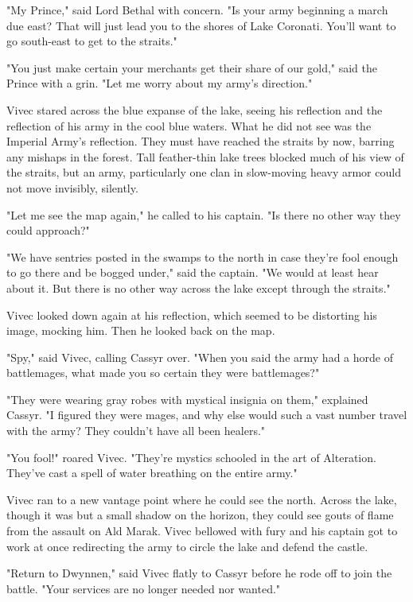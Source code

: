 "My Prince," said Lord Bethal with concern. "Is your army beginning a march due east? That will just lead you to the shores of Lake Coronati. You'll want to go south-east to get to the straits."

"You just make certain your merchants get their share of our gold," said the Prince with a grin. "Let me worry about my army's direction."

Vivec stared across the blue expanse of the lake, seeing his reflection and the reflection of his army in the cool blue waters. What he did not see was the Imperial Army's reflection. They must have reached the straits by now, barring any mishaps in the forest. Tall feather-thin lake trees blocked much of his view of the straits, but an army, particularly one clan in slow-moving heavy armor could not move invisibly, silently.

"Let me see the map again," he called to his captain. "Is there no other way they could approach?"

"We have sentries posted in the swamps to the north in case they're fool enough to go there and be bogged under," said the captain. "We would at least hear about it. But there is no other way across the lake except through the straits."

Vivec looked down again at his reflection, which seemed to be distorting his image, mocking him. Then he looked back on the map.

"Spy," said Vivec, calling Cassyr over. "When you said the army had a horde of battlemages, what made you so certain they were battlemages?"

"They were wearing gray robes with mystical insignia on them," explained Cassyr. "I figured they were mages, and why else would such a vast number travel with the army? They couldn't have all been healers."

"You fool!" roared Vivec. "They're mystics schooled in the art of Alteration. They've cast a spell of water breathing on the entire army."

Vivec ran to a new vantage point where he could see the north. Across the lake, though it was but a small shadow on the horizon, they could see gouts of flame from the assault on Ald Marak. Vivec bellowed with fury and his captain got to work at once redirecting the army to circle the lake and defend the castle.

"Return to Dwynnen," said Vivec flatly to Cassyr before he rode off to join the battle. "Your services are no longer needed nor wanted."

